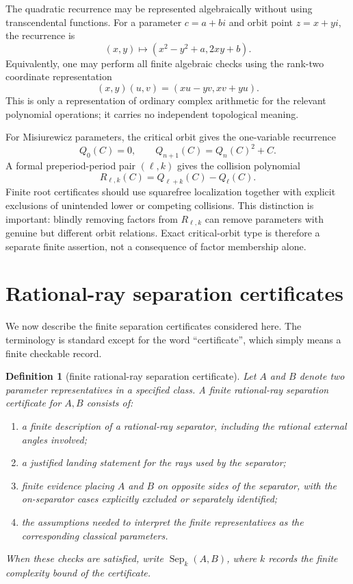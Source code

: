 \documentclass[11pt]{amsart}
\newtheorem{definition}[theorem]{Definition}
\begin{document}
The quadratic recurrence may be represented algebraically without using transcendental functions.  For a parameter \(c=a+bi\) and orbit point \(z=x+yi\), the recurrence is
\[
        (x,y)\mapsto (x^2-y^2+a,2xy+b).
\]
Equivalently, one may perform all finite algebraic checks using the rank-two coordinate representation
\[
        (x,y)(u,v)=(xu-yv,xv+yu).
\]
This is only a representation of ordinary complex arithmetic for the relevant polynomial operations; it carries no independent topological meaning.

For Misiurewicz parameters, the critical orbit gives the one-variable recurrence
\[
        Q_0(C)=0,\qquad Q_{n+1}(C)=Q_n(C)^2+C.
\]
A formal preperiod-period pair \((\ell,k)\) gives the collision polynomial
\[
        R_{\ell,k}(C)=Q_{\ell+k}(C)-Q_\ell(C).
\]
Finite root certificates should use squarefree localization together with explicit exclusions of unintended lower or competing collisions.  This distinction is important: blindly removing factors from \(R_{\ell,k}\) can remove parameters with genuine but different orbit relations.  Exact critical-orbit type is therefore a separate finite assertion, not a consequence of factor membership alone.

\section{Rational-ray separation certificates}

We now describe the finite separation certificates considered here.  The terminology is standard except for the word ``certificate'', which simply means a finite checkable record.

\begin{definition}[finite rational-ray separation certificate]
Let \(A\) and \(B\) denote two parameter representatives in a specified class.  A finite rational-ray separation certificate for \(A,B\) consists of:
\begin{enumerate}[label=(\roman*)]
\item a finite description of a rational-ray separator, including the rational external angles involved;
\item a justified landing statement for the rays used by the separator;
\item finite evidence placing \(A\) and \(B\) on opposite sides of the separator, with the on-separator cases explicitly excluded or separately identified;
\item the assumptions needed to interpret the finite representatives as the corresponding classical parameters.
\end{enumerate}
When these checks are satisfied, write \(\operatorname{Sep}_k(A,B)\), where \(k\) records the finite complexity bound of the certificate.
\end{definition}
\end{document}
